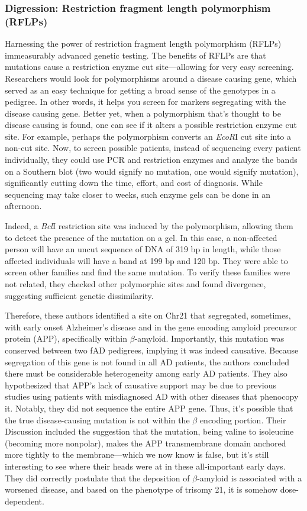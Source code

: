 \subsubsection*{Digression: Restriction fragment length polymorphism (RFLPs)}

Harnessing the power of restriction fragment length polymorphism (RFLPs) immeasurably advanced genetic testing. The benefits of RFLPs are that mutations cause a restriction enyzme cut site---allowing for very easy screening. Researchers would look for polymorphisms around a disease causing gene, which served as an easy technique for getting a broad sense of the genotypes in a pedigree. In other words, it helps you screen for markers segregating with the disease causing gene. Better yet, when a polymorphism that's thought to be disease causing is found, one can see if it alters a possible restriction enzyme cut site. For example, perhaps the polymorphism converts an \textit{EcoR}I cut site into a non-cut site. Now, to screen possible patients, instead of sequencing every patient individually, they could use PCR and restriction enzymes and analyze the bands on a Southern blot (two would signify no mutation, one would signify mutation), significantly cutting down the time, effort, and cost of diagnosis. While sequencing may take closer to weeks, such enzyme gels can be done in an afternoon.\newline

Indeed, a \textit{Bcl}I restriction site was induced by the polymorphism, allowing them to detect the presence of the mutation on a gel. In this case, a non-affected person will have an uncut sequence of DNA of 319 bp in length, while those affected individuals will have a band at 199 bp and 120 bp. They were able to screen other families and find the same mutation. To verify these families were not related, they checked other polymorphic sites and found divergence, suggesting sufficient genetic dissimilarity.\newline

Therefore, these authors identified a site on Chr21 that segregated, sometimes, with early onset Alzheimer's disease and in the gene encoding amyloid precursor protein (APP), specifically within $\beta$-amyloid. Importantly, this mutation was conserved between two fAD pedigrees, implying it was indeed causative. Because segregation of this gene is not found in all AD patients, the authors concluded there must be considerable heterogeneity among early AD patients. They also hypothesized that APP's lack of causative support may be due to previous studies using patients with misdiagnosed AD with other diseases that phenocopy it. Notably, they did not sequence the entire APP gene. Thus, it's possible that the true disease-causing mutation is not within the $\beta$ encoding portion. Their Discussion included the suggestion that the mutation, being valine to isoleucine (becoming more nonpolar), makes the APP transmembrane domain anchored more tightly to the membrane---which we now know is false, but it's still interesting to see where their heads were at in these all-important early days. They did correctly postulate that the deposition of $\beta$-amyloid is associated with a worsened disease, and based on the phenotype of trisomy 21, it is somehow dose-dependent.

